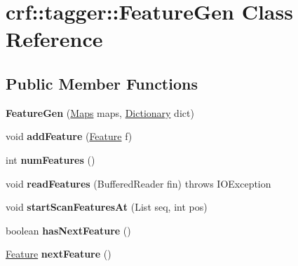\hypertarget{classcrf_1_1tagger_1_1FeatureGen}{
\section{crf::tagger::FeatureGen Class Reference}
\label{classcrf_1_1tagger_1_1FeatureGen}
}
\subsection*{Public Member Functions}
\begin{DoxyCompactItemize}
\item 
\hypertarget{classcrf_1_1tagger_1_1FeatureGen_add9b9d6e5dab177cb0ca7eb9896f9036}{
{\bfseries FeatureGen} (\hyperlink{classcrf_1_1tagger_1_1Maps}{Maps} maps, \hyperlink{classcrf_1_1tagger_1_1Dictionary}{Dictionary} dict)}
\label{classcrf_1_1tagger_1_1FeatureGen_add9b9d6e5dab177cb0ca7eb9896f9036}

\item 
\hypertarget{classcrf_1_1tagger_1_1FeatureGen_a2febd9f31bb702c68d97cb6dcd6b3dd7}{
void {\bfseries addFeature} (\hyperlink{classcrf_1_1tagger_1_1Feature}{Feature} f)}
\label{classcrf_1_1tagger_1_1FeatureGen_a2febd9f31bb702c68d97cb6dcd6b3dd7}

\item 
\hypertarget{classcrf_1_1tagger_1_1FeatureGen_a4180ae5b5b1e5232f726bf35a0bb7889}{
int {\bfseries numFeatures} ()}
\label{classcrf_1_1tagger_1_1FeatureGen_a4180ae5b5b1e5232f726bf35a0bb7889}

\item 
\hypertarget{classcrf_1_1tagger_1_1FeatureGen_ac0ed01de1545823bca55bd590f476363}{
void {\bfseries readFeatures} (BufferedReader fin)  throws IOException }
\label{classcrf_1_1tagger_1_1FeatureGen_ac0ed01de1545823bca55bd590f476363}

\item 
\hypertarget{classcrf_1_1tagger_1_1FeatureGen_ae6219b21652fb1d6ce972a134c3ef404}{
void {\bfseries startScanFeaturesAt} (List seq, int pos)}
\label{classcrf_1_1tagger_1_1FeatureGen_ae6219b21652fb1d6ce972a134c3ef404}

\item 
\hypertarget{classcrf_1_1tagger_1_1FeatureGen_ad4dc356a92dc96277f4648ff46c05b3d}{
boolean {\bfseries hasNextFeature} ()}
\label{classcrf_1_1tagger_1_1FeatureGen_ad4dc356a92dc96277f4648ff46c05b3d}

\item 
\hypertarget{classcrf_1_1tagger_1_1FeatureGen_a2fef1008442c8a68238d20008b0e4596}{
\hyperlink{classcrf_1_1tagger_1_1Feature}{Feature} {\bfseries nextFeature} ()}
\label{classcrf_1_1tagger_1_1FeatureGen_a2fef1008442c8a68238d20008b0e4596}

\end{DoxyCompactItemize}
